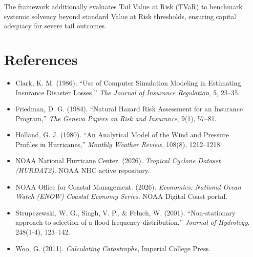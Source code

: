 \documentclass[11pt,article]{article}
\begin{document}
The framework additionally evaluates Tail Value at Risk (TVaR) to benchmark systemic solvency beyond standard Value at Risk thresholds, ensuring capital adequacy for severe tail outcomes.

\section{References}
\begin{itemize}
    \item Clark, K. M. (1986). ``Use of Computer Simulation Modeling in Estimating Insurance Disaster Losses,'' \textit{The Journal of Insurance Regulation}, 5, 23--35.
    \item Friedman, D. G. (1984). ``Natural Hazard Risk Assessment for an Insurance Program,'' \textit{The Geneva Papers on Risk and Insurance}, 9(1), 57--81.
    \item Holland, G. J. (1980). ``An Analytical Model of the Wind and Pressure Profiles in Hurricanes,'' \textit{Monthly Weather Review}, 108(8), 1212--1218.
    \item NOAA National Hurricane Center. (2026). \textit{Tropical Cyclone Dataset (HURDAT2)}. NOAA NHC active repository.
    \item NOAA Office for Coastal Management. (2026). \textit{Economics: National Ocean Watch (ENOW) Coastal Economy Series}. NOAA Digital Coast portal.
    \item Strupczewski, W. G., Singh, V. P., \& Feluch, W. (2001). ``Non-stationary approach to selection of a flood frequency distribution,'' \textit{Journal of Hydrology}, 248(1-4), 123--142.
    \item Woo, G. (2011). \textit{Calculating Catastrophe}, Imperial College Press.
\end{itemize}
\end{document}
